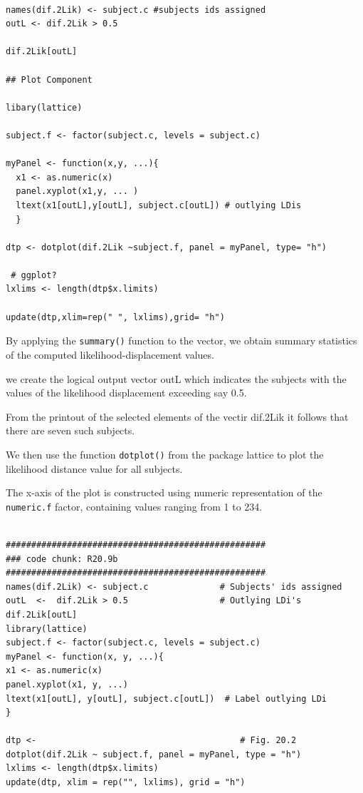 \documentclass[a4paper,12pt]{article}
\begin{document}
\begin{framed}
\begin{verbatim}

names(dif.2Lik) <- subject.c #subjects ids assigned
outL <- dif.2Lik > 0.5

dif.2Lik[outL]

## Plot Component

libary(lattice)

subject.f <- factor(subject.c, levels = subject.c)

myPanel <- function(x,y, ...){
  x1 <- as.numeric(x)
  panel.xyplot(x1,y, ... )
  ltext(x1[outL],y[outL], subject.c[outL]) # outlying LDis
  }

dtp <- dotplot(dif.2Lik ~subject.f, panel = myPanel, type= "h")

 # ggplot?
lxlims <- length(dtp$x.limits)

update(dtp,xlim=rep(" ", lxlims),grid= "h")
\end{verbatim}
\end{framed}


By applying the \texttt{summary()} function to the vector, we obtain summary statistics of the computed likelihood-displacement values.

we create the logical output vector outL which indicates the subjects with the values of the 
likelihood displacement exceeding say 0.5.

From the printout of the selected elements of the vectir dif.2Lik it follows that there are
seven such subjects.


We then use the function \texttt{dotplot()} from the package lattice to plot the 
likelihood distance value for all subjects.

The x-axis of the plot is constructed using numeric representation of the \texttt{numeric.f} factor, containing values ranging from 1 to 234.

\newpage
\begin{framed}
\begin{verbatim}

###################################################
### code chunk: R20.9b
###################################################
names(dif.2Lik) <- subject.c              # Subjects' ids assigned
outL  <-  dif.2Lik > 0.5                  # Outlying LDi's
dif.2Lik[outL]
library(lattice)
subject.f <- factor(subject.c, levels = subject.c)
myPanel <- function(x, y, ...){
x1 <- as.numeric(x)
panel.xyplot(x1, y, ...)
ltext(x1[outL], y[outL], subject.c[outL])  # Label outlying LDi
}

dtp <-                                        # Fig. 20.2
dotplot(dif.2Lik ~ subject.f, panel = myPanel, type = "h")           
lxlims <- length(dtp$x.limits)         
update(dtp, xlim = rep("", lxlims), grid = "h") 






\end{verbatim}	
	
\end{framed}
\end{document}
